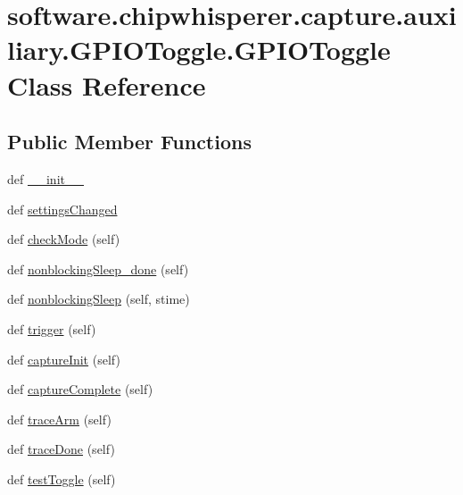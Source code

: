 \hypertarget{classsoftware_1_1chipwhisperer_1_1capture_1_1auxiliary_1_1GPIOToggle_1_1GPIOToggle}{}\section{software.\+chipwhisperer.\+capture.\+auxiliary.\+G\+P\+I\+O\+Toggle.\+G\+P\+I\+O\+Toggle Class Reference}
\label{classsoftware_1_1chipwhisperer_1_1capture_1_1auxiliary_1_1GPIOToggle_1_1GPIOToggle}
\subsection*{Public Member Functions}
\begin{DoxyCompactItemize}
\item 
def \hyperlink{classsoftware_1_1chipwhisperer_1_1capture_1_1auxiliary_1_1GPIOToggle_1_1GPIOToggle_ade013314c770d169a4bfea571c058c53}{\+\_\+\+\_\+init\+\_\+\+\_\+}
\item 
def \hyperlink{classsoftware_1_1chipwhisperer_1_1capture_1_1auxiliary_1_1GPIOToggle_1_1GPIOToggle_ae13d859f61419705661f364185589410}{settings\+Changed}
\item 
def \hyperlink{classsoftware_1_1chipwhisperer_1_1capture_1_1auxiliary_1_1GPIOToggle_1_1GPIOToggle_a567c700abeaa99bf794aea1482e96c96}{check\+Mode} (self)
\item 
def \hyperlink{classsoftware_1_1chipwhisperer_1_1capture_1_1auxiliary_1_1GPIOToggle_1_1GPIOToggle_a85d65b27213e7e307a51a20dbf30d9c6}{nonblocking\+Sleep\+\_\+done} (self)
\item 
def \hyperlink{classsoftware_1_1chipwhisperer_1_1capture_1_1auxiliary_1_1GPIOToggle_1_1GPIOToggle_ac5dfe954f68f5d21e2a9c550fb247d79}{nonblocking\+Sleep} (self, stime)
\item 
def \hyperlink{classsoftware_1_1chipwhisperer_1_1capture_1_1auxiliary_1_1GPIOToggle_1_1GPIOToggle_a300aaaf821ec6f2565ab3ce12d1f5795}{trigger} (self)
\item 
def \hyperlink{classsoftware_1_1chipwhisperer_1_1capture_1_1auxiliary_1_1GPIOToggle_1_1GPIOToggle_a3d0fac7473bd03c0c63237e186db7f39}{capture\+Init} (self)
\item 
def \hyperlink{classsoftware_1_1chipwhisperer_1_1capture_1_1auxiliary_1_1GPIOToggle_1_1GPIOToggle_a6e7cb5d75ccf5a524a8da92d215ce51a}{capture\+Complete} (self)
\item 
def \hyperlink{classsoftware_1_1chipwhisperer_1_1capture_1_1auxiliary_1_1GPIOToggle_1_1GPIOToggle_aa912ecb997e831dc9ec4c0bf1dee1558}{trace\+Arm} (self)
\item 
def \hyperlink{classsoftware_1_1chipwhisperer_1_1capture_1_1auxiliary_1_1GPIOToggle_1_1GPIOToggle_a29855a60bad562dbe9beabadfb666b3a}{trace\+Done} (self)
\item 
def \hyperlink{classsoftware_1_1chipwhisperer_1_1capture_1_1auxiliary_1_1GPIOToggle_1_1GPIOToggle_ae69a27abea8375d97eee10213b44d3c7}{test\+Toggle} (self)
\end{DoxyCompactItemize}
